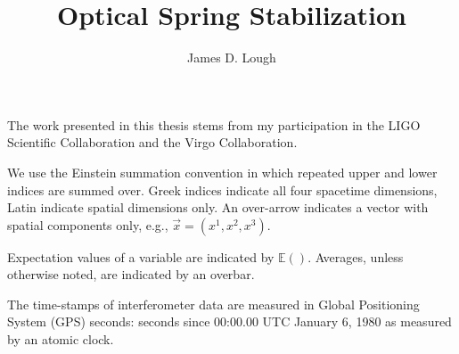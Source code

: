 \documentclass[12pt,notitlepage]{report}
\begin{document}

\title{
Optical Spring Stabilization
}
\author{James D. Lough}

\havededicationtrue
\dedication{to\\my little scientists,\\Elizabeth and Henry}
\haveminorfalse
\copyrighttrue
\doctoratetrue
\figurespagetrue
\tablespagetrue
\signedtitlepfalse

\beforepreface {}

The work presented in this thesis stems from my participation in the LIGO
Scientific Collaboration and the Virgo Collaboration.


We use the Einstein summation convention in which repeated upper and lower
indices are summed over. Greek indices indicate all four spacetime dimensions,
Latin indicate spatial dimensions only. An over-arrow indicates a vector with
spatial components only, e.g., $\vec{x} = (x^1,x^2,x^3)$.

\vspace{0.5cm}

\noindent Expectation values of a variable are indicated by $\mathbb{E}()$.
Averages, unless otherwise noted, are indicated by an overbar.

\vspace{0.5cm}

\noindent The time-stamps of interferometer data are measured in
Global Positioning System (GPS) seconds: seconds since 00:00.00 UTC
January 6, 1980 as measured by an atomic clock.



\afterpreface

\listoftodos

%

\label{ch:introduction}


%
\end{document}
